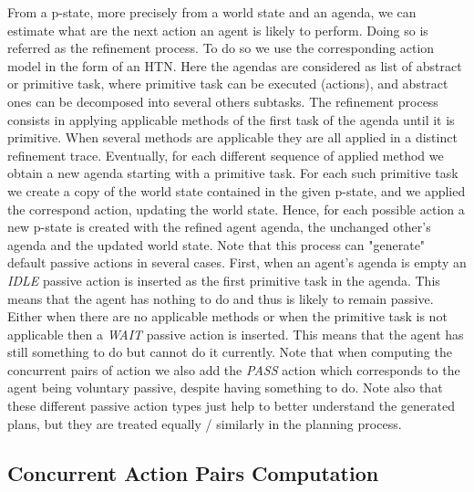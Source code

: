 From a p-state, more precisely from a world state and an agenda, we can estimate what are the next action an agent is likely to perform. Doing so is referred as the refinement process. To do so we use the corresponding action model in the form of an HTN. Here the agendas are considered as list of abstract or primitive task, where primitive task can be executed (actions), and abstract ones can be decomposed into several others subtasks. 
The refinement process consists in applying applicable methods of the first task of the agenda until it is primitive. When several methods are applicable they are all applied in a distinct refinement trace.
Eventually, for each different sequence of applied method we obtain a new agenda starting with a primitive task. For each such primitive task we create a copy of the world state contained in the given p-state, and we applied the correspond action, updating the world state. 
Hence, for each possible action a new p-state is created with the refined agent agenda, the unchanged other's agenda and the updated world state. 
Note that this process can "generate" default passive actions in several cases. First, when an agent's agenda is empty an \textit{IDLE} passive action is inserted as the first primitive task in the agenda. This means that the agent has nothing to do and thus is likely to remain passive. Either when there are no applicable methods or when the primitive task is not applicable then a \textit{WAIT} passive action is inserted. This means that the agent has still something to do but cannot do it currently. Note that when computing the concurrent pairs of action we also add the \textit{PASS} action which corresponds to the agent being voluntary passive, despite having something to do. Note also that these different passive action types just help to better understand the generated plans, but they are treated equally / similarly in the planning process.

    \subsection{Concurrent Action Pairs Computation}

